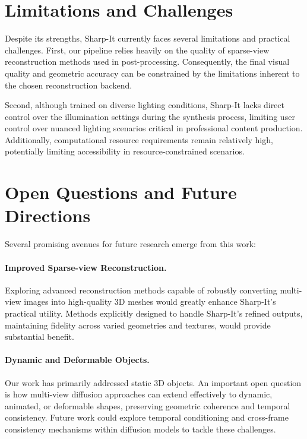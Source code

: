\section{Limitations and Challenges}

Despite its strengths, Sharp-It currently faces several limitations and practical challenges. First, our pipeline relies heavily on the quality of sparse-view reconstruction methods used in post-processing. Consequently, the final visual quality and geometric accuracy can be constrained by the limitations inherent to the chosen reconstruction backend.

Second, although trained on diverse lighting conditions, Sharp-It lacks direct control over the illumination settings during the synthesis process, limiting user control over nuanced lighting scenarios critical in professional content production. Additionally, computational resource requirements remain relatively high, potentially limiting accessibility in resource-constrained scenarios.

\section{Open Questions and Future Directions}

Several promising avenues for future research emerge from this work:

\paragraph{Improved Sparse-view Reconstruction.}
Exploring advanced reconstruction methods capable of robustly converting multi-view images into high-quality 3D meshes would greatly enhance Sharp-It’s practical utility. Methods explicitly designed to handle Sharp-It’s refined outputs, maintaining fidelity across varied geometries and textures, would provide substantial benefit.

\paragraph{Dynamic and Deformable Objects.}
Our work has primarily addressed static 3D objects. An important open question is how multi-view diffusion approaches can extend effectively to dynamic, animated, or deformable shapes, preserving geometric coherence and temporal consistency. Future work could explore temporal conditioning and cross-frame consistency mechanisms within diffusion models to tackle these challenges.

